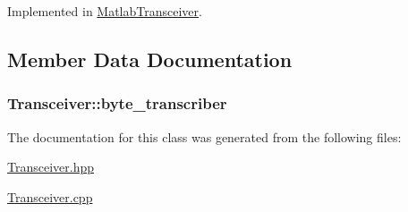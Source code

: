 Implemented in \hyperlink{classMatlabTransceiver_a4983e5511e1aa32bedc2e1c5e4a0a015}{Matlab\+Transceiver}.



\subsection{Member Data Documentation}
\subsubsection[{\texorpdfstring{byte\+\_\+transcriber}{byte_transcriber}}]{ Transceiver\+::byte\+\_\+transcriber}\hypertarget{classTransceiver_a126dcfc63c0a937fc758c5c464d3e36a}{}\label{classTransceiver_a126dcfc63c0a937fc758c5c464d3e36a}


The documentation for this class was generated from the following files\+:\begin{DoxyCompactItemize}
\item 
\hyperlink{Transceiver_8hpp}{Transceiver.\+hpp}\item 
\hyperlink{Transceiver_8cpp}{Transceiver.\+cpp}\end{DoxyCompactItemize}
